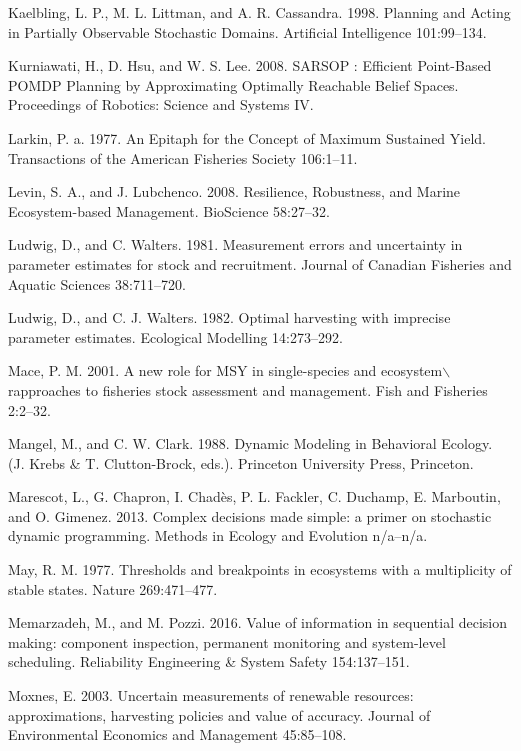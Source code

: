 \documentclass[3p]{elsarticle} %
\begin{document}
\hypertarget{ref-Kaelbling1998}{}
Kaelbling, L. P., M. L. Littman, and A. R. Cassandra. 1998. Planning and
Acting in Partially Observable Stochastic Domains. Artificial
Intelligence 101:99--134.

\hypertarget{ref-Kurniawati2008}{}
Kurniawati, H., D. Hsu, and W. S. Lee. 2008. SARSOP : Efficient
Point-Based POMDP Planning by Approximating Optimally Reachable Belief
Spaces. Proceedings of Robotics: Science and Systems IV.

\hypertarget{ref-Larkin1977}{}
Larkin, P. a. 1977. An Epitaph for the Concept of Maximum Sustained
Yield. Transactions of the American Fisheries Society 106:1--11.

\hypertarget{ref-Levin2008}{}
Levin, S. A., and J. Lubchenco. 2008. Resilience, Robustness, and Marine
Ecosystem-based Management. BioScience 58:27--32.

\hypertarget{ref-Ludwig1981}{}
Ludwig, D., and C. Walters. 1981. Measurement errors and uncertainty in
parameter estimates for stock and recruitment. Journal of Canadian
Fisheries and Aquatic Sciences 38:711--720.

\hypertarget{ref-Ludwig1982}{}
Ludwig, D., and C. J. Walters. 1982. Optimal harvesting with imprecise
parameter estimates. Ecological Modelling 14:273--292.

\hypertarget{ref-Mace2001}{}
Mace, P. M. 2001. A new role for MSY in single-species and
ecosystem\(\backslash\)rapproaches to fisheries stock assessment and
management. Fish and Fisheries 2:2--32.

\hypertarget{ref-Mangel1988}{}
Mangel, M., and C. W. Clark. 1988. Dynamic Modeling in Behavioral
Ecology. (J. Krebs \& T. Clutton-Brock, eds.). Princeton University
Press, Princeton.

\hypertarget{ref-Marescot2013}{}
Marescot, L., G. Chapron, I. Chadès, P. L. Fackler, C. Duchamp, E.
Marboutin, and O. Gimenez. 2013. Complex decisions made simple: a primer
on stochastic dynamic programming. Methods in Ecology and Evolution
n/a--n/a.

\hypertarget{ref-May1977}{}
May, R. M. 1977. Thresholds and breakpoints in ecosystems with a
multiplicity of stable states. Nature 269:471--477.

\hypertarget{ref-Memarzadeh2016b}{}
Memarzadeh, M., and M. Pozzi. 2016. Value of information in sequential
decision making: component inspection, permanent monitoring and
system-level scheduling. Reliability Engineering \& System Safety
154:137--151.

\hypertarget{ref-Moxnes2003}{}
Moxnes, E. 2003. Uncertain measurements of renewable resources:
approximations, harvesting policies and value of accuracy. Journal of
Environmental Economics and Management 45:85--108.
\end{document}
